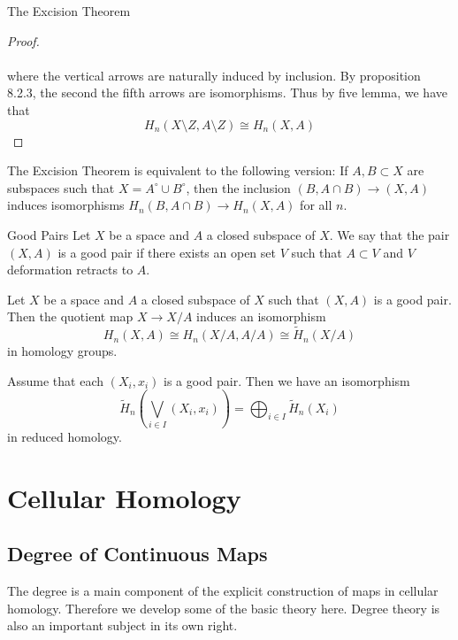 \documentclass[a4paper]{article}
\begin{document}
\begin{thm}{The Excision Theorem}{}
\begin{proof}
\\~\\
where the vertical arrows are naturally induced by inclusion. By proposition 8.2.3, the second the fifth arrows are isomorphisms. Thus by five lemma, we have that $$H_n(X\setminus Z,A\setminus Z)\cong H_n(X,A)$$
\end{proof}
\end{thm}

\begin{lmm}{}{} The Excision Theorem is equivalent to the following version: If $A,B\subset X$ are subspaces such that $X=A^\circ\cup B^\circ$, then the inclusion $(B,A\cap B)\to (X,A)$ induces isomorphisms $H_n(B,A\cap B)\to H_n(X,A)$ for all $n$. 
\end{lmm}

\begin{defn}{Good Pairs}{} Let $X$ be a space and $A$ a closed subspace of $X$. We say that the pair $(X,A)$ is a good pair if there exists an open set $V$ such that $A\subset V$ and $V$ deformation retracts to $A$. 
\end{defn}

\begin{prp}{}{} Let $X$ be a space and $A$ a closed subspace of $X$ such that $(X,A)$ is a good pair. Then the quotient map $X\to X/A$ induces an isomorphism $$H_n(X,A)\cong H_n(X/A,A/A)\cong\widetilde{H}_n(X/A)$$ in homology groups. 
\end{prp}

\begin{lmm}{}{} Assume that each $(X_i,x_i)$ is a good pair. Then we have an isomorphism $$\widetilde{H}_n\left(\bigvee_{i\in I}(X_i,x_i)\right)=\bigoplus_{i\in I}\widetilde{H}_n(X_i)$$ in reduced homology. 
\end{lmm}

\pagebreak
\section{Cellular Homology}
\subsection{Degree of Continuous Maps}
The degree is a main component of the explicit construction of maps in cellular homology. Therefore we develop some of the basic theory here. Degree theory is also an important subject in its own right. 
\end{document}
